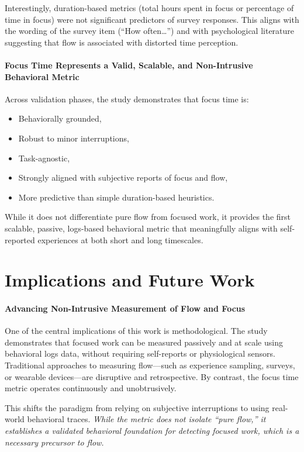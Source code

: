 Interestingly, duration-based metrics (total hours spent in focus or percentage of time in focus) were not significant predictors of survey responses. This aligns with the wording of the survey item (“How often…”) and with psychological literature suggesting that flow is associated with distorted time perception.

\paragraph{Focus Time Represents a Valid, Scalable, and Non-Intrusive Behavioral Metric}
Across validation phases, the study demonstrates that focus time is:
\begin{itemize}
    \item Behaviorally grounded,
    \item Robust to minor interruptions,
    \item Task-agnostic,
    \item Strongly aligned with subjective reports of focus and flow,
    \item More predictive than simple duration-based heuristics.
\end{itemize}
While it does not differentiate pure flow from focused work, it provides the first scalable, passive, logs-based behavioral metric that meaningfully aligns with self-reported experiences at both short and long timescales.

\section{Implications and Future Work}
\paragraph{Advancing Non-Intrusive Measurement of Flow and Focus}
One of the central implications of this work is methodological. The study demonstrates that focused work can be measured passively and at scale using behavioral logs data, without requiring self-reports or physiological sensors. Traditional approaches to measuring flow—such as experience sampling, surveys, or wearable devices—are disruptive and retrospective. By contrast, the focus time metric operates continuously and unobtrusively.

This shifts the paradigm from relying on subjective interruptions to using real-world behavioral traces. \textit{While the metric does not isolate “pure flow,” it establishes a validated behavioral foundation for detecting focused work, which is a necessary precursor to flow.}

